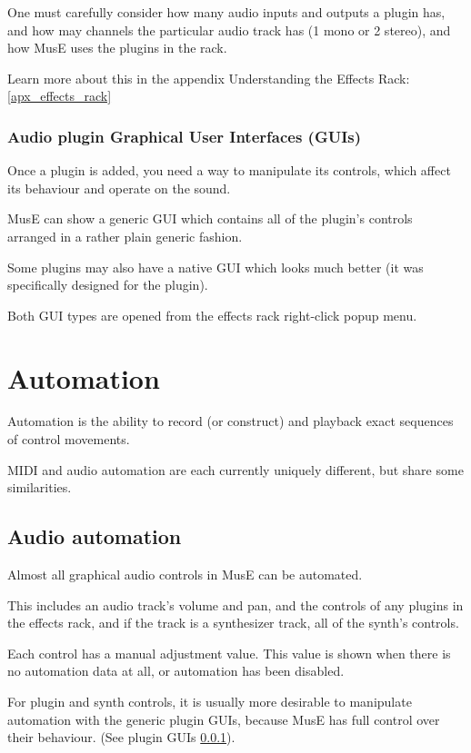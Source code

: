 \documentclass[a4paper]{report}
\begin{document}
One must carefully consider how many audio inputs and outputs a plugin
has, and how may channels the particular audio track has (1 mono or
2 stereo), and how MusE uses the plugins in the rack.

Learn more about this in the appendix Understanding the Effects Rack:
\ref{apx_effects_rack}

\subsubsection{Audio plugin Graphical User Interfaces (GUIs)} 
\label{plugin_guis} Once a plugin is added, you need a way to 
manipulate its controls, which affect its behaviour and operate
on the sound.

MusE can show a generic GUI which contains all of the
plugin's controls arranged in a rather plain generic fashion.

Some plugins may also have a native GUI which looks much better (it
was specifically designed for the plugin).

Both GUI types are opened from the effects rack right-click popup menu.

\section{Automation} \label{automation}
Automation is the ability to record (or construct) and playback
exact sequences of control movements.

MIDI and audio automation are each currently uniquely different,
but share some similarities.

\subsection{Audio automation} \label{audio_automation}
Almost all graphical audio controls in MusE can be automated.

This includes an audio track's volume and pan, and the controls
of any plugins in the effects rack, and if the track is a
synthesizer track, all of the synth's controls.

Each control has a manual adjustment value. This value is shown
when there is no automation data at all, or automation has been
disabled.

For plugin and synth controls, it is usually more desirable to
manipulate automation with the generic plugin GUIs, because
MusE has full control over their behaviour. (See plugin GUIs
\ref{plugin_guis}).
\end{document}
